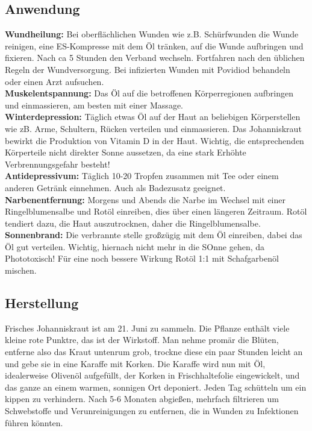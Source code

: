 \subsection{Anwendung}

\textbf{Wundheilung:} Bei oberflächlichen Wunden wie z.B. Schürfwunden die Wunde reinigen, eine ES-Kompresse mit dem Öl tränken, auf die Wunde aufbringen und fixieren. Nach ca 5 Stunden den Verband wechseln. Fortfahren nach den üblichen Regeln der Wundversorgung. Bei infizierten Wunden mit Povidiod behandeln oder einen Arzt aufsuchen.\\ 

\textbf{Muskelentspannung:} Das Öl auf die betroffenen Körperregionen aufbringen und einmassieren, am besten mit einer Massage. \\ 

\textbf{Winterdepression:} Täglich etwas Öl auf der Haut an beliebigen Körperstellen wie zB. Arme, Schultern, Rücken verteilen und einmassieren. Das Johanniskraut bewirkt die Produktion von Vitamin D in der Haut. Wichtig, die entsprechenden Körperteile nicht direkter Sonne aussetzen, da eine stark Erhöhte Verbrennungsgefahr besteht! \\ 

\textbf{Antidepressivum:} Täglich 10-20 Tropfen zusammen mit Tee oder einem anderen Getränk einnehmen. Auch als Badezusatz geeignet. \\ 

\textbf{Narbenentfernung:} Morgens und Abends die Narbe im Wechsel mit einer Ringelblumensalbe und Rotöl einreiben, dies über einen längeren Zeitraum. Rotöl tendiert dazu, die Haut auszutrocknen, daher die Ringelblumensalbe.\\

\textbf{Sonnenbrand:} Die verbrannte stelle großzügig mit dem Öl einreiben, dabei das Öl gut verteilen. Wichtig, hiernach nicht mehr in die SOnne gehen, da Phototoxisch! Für eine noch bessere Wirkung Rotöl 1:1 mit Schafgarbenöl mischen.

\subsection{Herstellung}

Frisches Johanniskraut ist am 21. Juni zu sammeln. Die Pflanze enthält viele kleine rote Punktre, das ist der Wirkstoff. Man nehme promär die Blüten, entferne also das Kraut untenrum grob, trockne diese ein paar Stunden leicht an und gebe sie in eine Karaffe mit Korken. Die Karaffe wird nun mit Öl, idealerweise Olivenöl aufgefüllt, der Korken in Frischhaltefolie eingewickelt, und das ganze an einem warmen, sonnigen Ort deponiert. Jeden Tag schütteln um ein kippen zu verhindern. Nach 5-6 Monaten abgießen, mehrfach filtrieren um Schwebstoffe und Verunreinigungen zu entfernen, die in Wunden zu Infektionen führen könnten.

